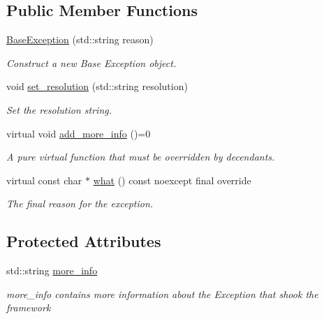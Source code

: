 \subsection*{Public Member Functions}
\begin{DoxyCompactItemize}
\item 
\hyperlink{classtestcaser_1_1exceptions_1_1BaseException_a70b5f42e6197e2600f7163f843060af2}{Base\+Exception} (std\+::string reason)
\begin{DoxyCompactList}\small\item\em Construct a new Base Exception object. \end{DoxyCompactList}\item 
void \hyperlink{classtestcaser_1_1exceptions_1_1BaseException_a92c371d40b0f3dbaa7de968ea67e5211}{set\+\_\+resolution} (std\+::string resolution)
\begin{DoxyCompactList}\small\item\em Set the resolution string. \end{DoxyCompactList}\item 
\mbox{\label{classtestcaser_1_1exceptions_1_1BaseException_ad607ea04e2cb4ad9b8d0e2e6b6734f2f}} 
virtual void \hyperlink{classtestcaser_1_1exceptions_1_1BaseException_ad607ea04e2cb4ad9b8d0e2e6b6734f2f}{add\+\_\+more\+\_\+info} ()=0
\begin{DoxyCompactList}\small\item\em A pure virtual function that must be overridden by decendants. \end{DoxyCompactList}\item 
virtual const char $\ast$ \hyperlink{classtestcaser_1_1exceptions_1_1BaseException_a76d41683a93c7c45cd446ee161344f05}{what} () const noexcept final override
\begin{DoxyCompactList}\small\item\em The final reason for the exception. \end{DoxyCompactList}\end{DoxyCompactItemize}
\subsection*{Protected Attributes}
\begin{DoxyCompactItemize}
\item 
\mbox{\label{classtestcaser_1_1exceptions_1_1BaseException_abfc26d4451ae832886c32ad2e283104e}} 
std\+::string \hyperlink{classtestcaser_1_1exceptions_1_1BaseException_abfc26d4451ae832886c32ad2e283104e}{more\+\_\+info}
\begin{DoxyCompactList}\small\item\em more\+\_\+info contains more information about the Exception that shook the framework \end{DoxyCompactList}\end{DoxyCompactItemize}


